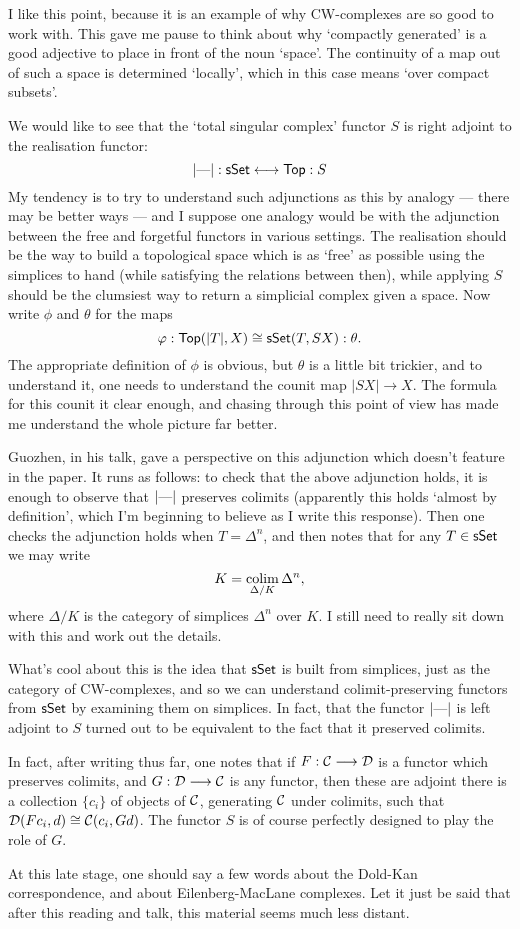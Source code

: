 \documentclass[11pt]{article}
\begin{document}
\begin{MilnorGeometricRealization}
I like this point, because it is an example of why CW-complexes are so good to work with. This gave me pause to think about why `compactly generated' is a good adjective to place in front of the noun `space'. The continuity of a map out of such a space is determined `locally', which in this case means `over compact subsets'. 

We would like to see that the `total singular complex' functor $S$ is right adjoint to the realisation functor:
\[|\textup{---}|:\operatorname{{\mathsf{sSet}}}\longleftrightarrow\operatorname{{\mathsf{Top}}}:S\]
My tendency is to try to understand such adjunctions as this by analogy --- there may be better ways --- and I suppose one analogy would be with the adjunction between the free and forgetful functors in various settings. The realisation should be the way to build a topological space which is as `free' as possible using the simplices to hand (while satisfying the relations between then), while applying $S$ should be the clumsiest way to return a simplicial complex given a space. Now write $\phi$ and $\theta$ for the maps
\[\varphi:\operatorname{{\mathsf{Top}}}(|T|,X)\cong\operatorname{{\mathsf{sSet}}}(T,SX): \theta.\]
The appropriate definition of $\phi$ is obvious, but $\theta$ is a little bit trickier, and to understand it, one needs to understand the counit map $|SX|\to X$. The formula for this counit it clear enough, and chasing through this point of view has made me understand the whole picture far better.

Guozhen, in his talk, gave a perspective on this adjunction which doesn't feature in the paper. It runs as follows: to check that the above adjunction holds, it is enough to observe that $|\textup{---}|$ preserves colimits (apparently this holds `almost by definition', which I'm beginning to believe as I write this response). Then one checks the adjunction holds when $T=\Delta^n$, and then notes that for any $T\in\operatorname{{\mathsf{sSet}}}$ we may write
\[K=\operatorname*{colim}_{\Delta/K}\Delta^n,\]
where $\Delta/K$ is the category of simplices $\Delta^n$ over $K$. I still need to really sit down with this and work out the details.

What's cool about this is the idea that $\operatorname{{\mathsf{sSet}}}$ is built from simplices, just as the category of CW-complexes, and so we can understand colimit-preserving functors from $\operatorname{{\mathsf{sSet}}}$ by examining them on simplices. In fact, that the functor $|\textup{---}|$ is left adjoint to $S$ turned out to be equivalent to the fact that it preserved colimits.

In fact, after writing thus far, one notes that if $F:\mathcal{C}\longrightarrow\mathcal{D}$ is a functor which preserves colimits, and $G:\mathcal{D}\longrightarrow\mathcal{C}$ is any functor, then these are adjoint \Iff there is a collection $\{c_i\}$ of objects of $\mathcal{C}$, generating $\mathcal{C}$ under colimits, such that $\mathcal{D}(Fc_i,d)\cong\mathcal{C}(c_i,Gd)$. The functor $S$ is of course perfectly designed to play the role of $G$.

At this late stage, one should say a few words about the Dold-Kan correspondence, and about Eilenberg-MacLane complexes. Let it just be said that after this reading and talk, this material seems much less distant.

\pagebreak
\end{MilnorGeometricRealization}
\end{document}
